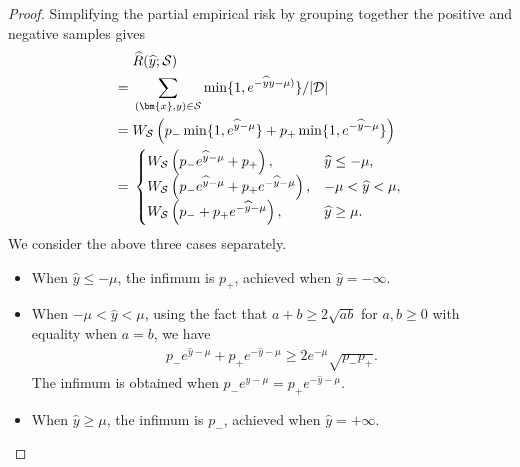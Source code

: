 \documentclass[letterpaper]{article} %
\newcommand{\bx}{{\bm{x}}}
\newcommand{\cS}{{\cal{S}}}
\newcommand{\cD}{{\cal{D}}}
\newcommand{\WS}{{W_{\cal{S}}}}
\begin{document}
\begin{proof}
    Simplifying the partial empirical risk by grouping together the positive and negative samples gives
    \begin{align*}
    &\; \widehat{R}(\widehat{y};\cS) \\
        =&\; \sum_{(\bx,y)\in\cS} \min\{1, e^{-\widehat{y}y-\mu)}\}/|\cD| \\
        =&\; \WS \left(
                p_{-} \min\{1, e^{\widehat{y}-\mu}\}
                +
                p_{+} \min\{1,e^{-\widehat{y}-\mu}\}
                \right) \\
        =&\;
        \begin{cases}
            \WS \left(p_{-} e^{\widehat{y}-\mu} + p_{+} \right),
                & \widehat{y}\leq -\mu, \\
            \WS \left(p_{-} e^{\widehat{y} - \mu} + p_{+} e^{-\widehat{y}-\mu}\right),
                & -\mu<\widehat{y}<\mu, \\
            \WS \left(p_{-} + p_{+} e^{-\widehat{y}-\mu}\right),
                & \widehat{y}\geq \mu.
            \end{cases}
    \end{align*}
    We consider the above three cases separately.
    \begin{itemize}
        \item When $\widehat{y} \leq -\mu$, the infimum is $p_{+}$, achieved when $\widehat{y} = -\infty$.
        \item When $-\mu<\widehat{y}<\mu$, using the fact that $a + b \ge 2\sqrt{ab}$ for
            $a, b \ge 0$ with equality when $a = b$, we have
            \begin{align*}
                p_{-} e^{\widehat{y} - \mu} + p_{+} e^{-\widehat{y}-\mu}
                \ge 2 e^{-\mu} \sqrt{p_{-} p_{+}}.
            \end{align*}
            The infimum is obtained when
            $p_{-} e^{\widehat{y} - \mu} = p_{+} e^{-\widehat{y}-\mu}$.
        \item
            When $\widehat{y} \geq \mu$, the infimum is $p_{-}$, achieved when
            $\widehat{y} = +\infty$.
    \end{itemize}


\end{proof}
\end{document}
